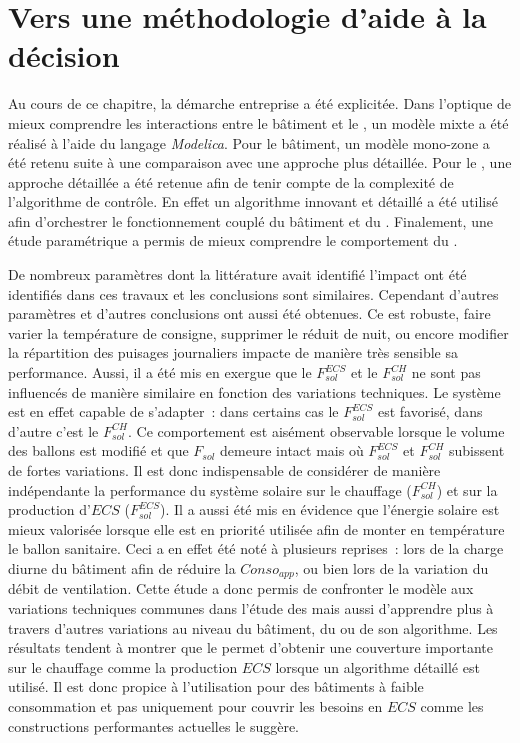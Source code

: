 \section{Vers une méthodologie d’aide à la décision} %
\label{sec:vers_une_methodologie_d_aide_a_la_decision}
Au cours de ce chapitre, la démarche entreprise a été explicitée. Dans l’optique de mieux
comprendre les interactions entre le bâtiment et le , un modèle mixte a été réalisé à
l’aide du langage \textit{Modelica}. Pour le bâtiment, un modèle mono-zone a été retenu
suite à une comparaison avec une approche plus détaillée. Pour le , une approche
détaillée a été retenue afin de tenir compte de la complexité de l’algorithme de contrôle.
En effet un algorithme innovant et détaillé a été utilisé afin d’orchestrer le
fonctionnement couplé du bâtiment et du . Finalement, une étude paramétrique a permis
de mieux comprendre le comportement du .

De nombreux paramètres dont la littérature avait identifié l’impact ont été identifiés dans
ces travaux et les conclusions sont similaires. Cependant d’autres paramètres et d’autres
conclusions ont aussi été obtenues. Ce  est robuste, faire varier la température de
consigne, supprimer le réduit de nuit, ou encore modifier la répartition des puisages
journaliers impacte de manière très sensible sa performance. Aussi, il a été mis en exergue que
le $F_{sol}^{ECS}$ et le $F_{sol}^{CH}$ ne sont pas influencés de manière similaire en
fonction des variations techniques. Le système est en effet capable de s’adapter~: dans
certains cas le $F_{sol}^{ECS}$ est favorisé, dans d’autre c’est le $F_{sol}^{CH}$. Ce
comportement est aisément observable lorsque le volume des ballons est modifié et que
$F_{sol}$ demeure intact mais où $F_{sol}^{ECS}$ et $F_{sol}^{CH}$ subissent de fortes
variations. Il est donc indispensable de considérer de manière indépendante la performance
du système solaire sur le chauffage ($F_{sol}^{CH}$) et sur la production d’$ECS$
($F_{sol}^{ECS}$). Il a aussi été mis en évidence que l’énergie solaire est mieux
valorisée lorsque elle est en priorité utilisée afin de monter en température le ballon
sanitaire. Ceci a en effet été noté à plusieurs reprises~: lors de la charge diurne du
bâtiment afin de réduire la $Conso_{app}$, ou bien lors de la variation du débit de
ventilation. Cette étude a donc permis de confronter le modèle aux variations techniques
communes dans l’étude des  mais aussi d’apprendre plus à travers d’autres variations
au niveau du bâtiment, du  ou de son algorithme. Les résultats tendent à
montrer que le  permet d’obtenir une couverture importante sur le chauffage comme la
production $ECS$ lorsque un algorithme détaillé est utilisé. Il est donc propice à
l’utilisation pour des bâtiments à faible consommation et pas uniquement pour couvrir les
besoins en $ECS$ comme les constructions performantes actuelles le suggère.

